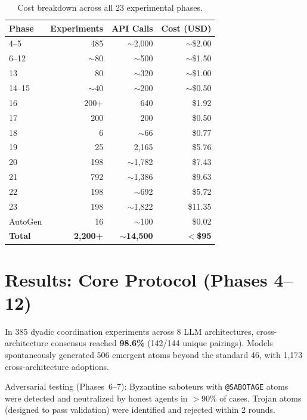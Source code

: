\documentclass[11pt,a4paper]{article}
\begin{document}
\begin{table}[H]
\centering\small
\caption{Cost breakdown across all 23 experimental phases.}\label{tab:budget}
\begin{tabular}{@{}lrrr@{}}
\toprule
\textbf{Phase} & \textbf{Experiments} & \textbf{API Calls} & \textbf{Cost (USD)} \\
\midrule
4--5   & 485     & $\sim$2,000 & $\sim$\$2.00 \\
6--12  & $\sim$80& $\sim$500   & $\sim$\$1.50 \\
13     & 80      & $\sim$320   & $\sim$\$1.00 \\
14--15 & $\sim$40& $\sim$200   & $\sim$\$0.50 \\
16     & 200+    & 640         & \$1.92 \\
17     & 200     & 200         & \$0.50 \\
18     & 6       & $\sim$66    & \$0.77 \\
19     & 25      & 2,165       & \$5.76 \\
20     & 198     & $\sim$1,782 & \$7.43 \\
21     & 792     & $\sim$1,386 & \$9.63 \\
22     & 198     & $\sim$692   & \$5.72 \\
23     & 198     & $\sim$1,822 & \$11.35 \\
AutoGen& 16      & $\sim$100   & \$0.02 \\
\midrule
\textbf{Total} & \textbf{2,200+} & \textbf{$\sim$14,500} & \textbf{$<$\$95} \\
\bottomrule
\end{tabular}
\end{table}

\section{Results: Core Protocol (Phases 4--12)}\label{sec:core}

In 385 dyadic coordination experiments across 8 LLM architectures,
cross-architecture consensus reached \textbf{98.6\%} (142/144 unique
pairings).  Models spontaneously generated 506 emergent atoms beyond
the standard 46, with 1,173 cross-architecture adoptions.

Adversarial testing (Phases~6--7): Byzantine saboteurs with
\texttt{@SABOTAGE} atoms were detected and neutralized by honest
agents in $>$90\% of cases.  Trojan atoms (designed to pass
validation) were identified and rejected within 2 rounds.
\end{document}
